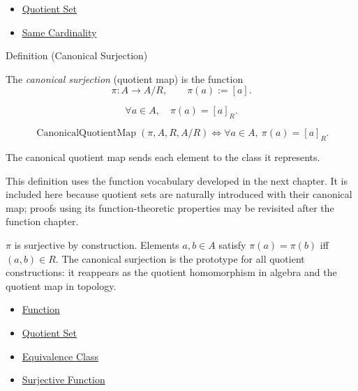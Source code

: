\begin{dependencies}
\begin{itemize}
  \item \hyperref[def:quotient-set]{Quotient Set}
  \item \hyperref[def:same-cardinality]{Same Cardinality}
\end{itemize}
\end{dependencies}

\begin{definitionbox}{Definition (Canonical Surjection)}
\begin{definition}\label{def:canonical-surj}
The \emph{canonical surjection} (quotient map) is the function
\[
\pi : A \to A/R,
\qquad
\pi(a) := [a].
\]
\end{definition}
\end{definitionbox}

\begin{remark*}
\[
  \forall a\in A,\quad
  \pi(a)=[a]_R.
\]
\end{remark*}

\begin{remark*}
\[
  \operatorname{CanonicalQuotientMap}(\pi,A,R,A/R)
  \iff
  \forall a\in A,\ \pi(a)=[a]_R.
\]
\end{remark*}

\begin{remark*}[Interpretation]
The canonical quotient map sends each element to the class it represents.
\end{remark*}

\begin{remark*}[Exposition]
This definition uses the function vocabulary developed in the next chapter.
It is included here because quotient sets are naturally introduced with their
canonical map; proofs using its function-theoretic properties may be revisited
after the function chapter.
\end{remark*}

\begin{remark*}[Exposition]
$\pi$ is surjective by construction. Elements $a, b \in A$ satisfy
$\pi(a) = \pi(b)$ iff $(a,b) \in R$. The canonical surjection is the
prototype for all quotient constructions: it reappears as the quotient
homomorphism in algebra and the quotient map in topology.
\end{remark*}

\begin{dependencies}
\begin{itemize}
  \item \hyperref[def:function]{Function}
  \item \hyperref[def:quotient-set]{Quotient Set}
  \item \hyperref[def:equiv-class]{Equivalence Class}
  \item \hyperref[def:surjective]{Surjective Function}
\end{itemize}
\end{dependencies}

